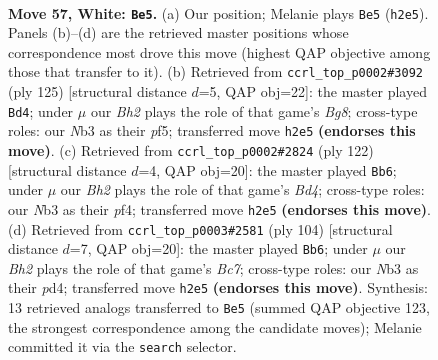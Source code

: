 \documentclass[11pt]{article}
\begin{document}
\clearpage

\begin{figure}[p]\centering
\begin{subfigure}{0.46\textwidth}\centering
\resizebox{\linewidth}{!}{%
\newchessgame
\chessboard[
  setfen={6k1/2P5/2r5/8/8/1N6/5K1B/8 w - - 27 57},
  showmover=false,
  pgfstyle=straightmove, color=movearrow, markmove={h2-e5}
]}
\caption{}
\end{subfigure}\hfill
\begin{subfigure}{0.46\textwidth}\centering
\resizebox{\linewidth}{!}{%
\newchessgame
\chessboard[
  setfen={8/5k2/2R5/2p2P2/8/8/4K3/6b1 b - - 8 63},
  showmover=false,
  pgfstyle=straightmove, color=movearrow, markmove={g1-d4}
]}
\caption{}
\end{subfigure}
\\[4pt]
\begin{subfigure}{0.46\textwidth}\centering
\resizebox{\linewidth}{!}{%
\newchessgame
\chessboard[
  setfen={r7/P7/4k3/8/3B1p2/8/8/5K2 w - - 9 62},
  showmover=false,
  pgfstyle=straightmove, color=movearrow, markmove={d4-b6}
]}
\caption{}
\end{subfigure}\hfill
\begin{subfigure}{0.46\textwidth}\centering
\resizebox{\linewidth}{!}{%
\newchessgame
\chessboard[
  setfen={8/2B5/6k1/8/3p4/8/6rP/4K3 w - - 4 53},
  showmover=false,
  pgfstyle=straightmove, color=movearrow, markmove={c7-b6}
]}
\caption{}
\end{subfigure}
\caption{\textbf{Move 57, White: \texttt{Be5}.} (a) Our position; Melanie plays \texttt{Be5} (\texttt{h2e5}). Panels (b)--(d) are the retrieved master positions whose correspondence most drove this move (highest QAP objective among those that transfer to it). (b) Retrieved from \texttt{ccrl\_top\_p0002\#3092} (ply 125) [structural distance $d$=5, QAP obj=22]: the master played \texttt{Bd4}; under $\mu$ our \emph{Bh2} plays the role of that game's \emph{Bg8}; cross-type roles: our \emph{N}b3 as their \emph{p}f5; transferred move \texttt{h2e5} \textbf{(endorses this move)}. (c) Retrieved from \texttt{ccrl\_top\_p0002\#2824} (ply 122) [structural distance $d$=4, QAP obj=20]: the master played \texttt{Bb6}; under $\mu$ our \emph{Bh2} plays the role of that game's \emph{Bd4}; cross-type roles: our \emph{N}b3 as their \emph{p}f4; transferred move \texttt{h2e5} \textbf{(endorses this move)}. (d) Retrieved from \texttt{ccrl\_top\_p0003\#2581} (ply 104) [structural distance $d$=7, QAP obj=20]: the master played \texttt{Bb6}; under $\mu$ our \emph{Bh2} plays the role of that game's \emph{Bc7}; cross-type roles: our \emph{N}b3 as their \emph{p}d4; transferred move \texttt{h2e5} \textbf{(endorses this move)}. Synthesis: 13 retrieved analogs transferred to \texttt{Be5} (summed QAP objective 123, the strongest correspondence among the candidate moves); Melanie committed it via the \texttt{search} selector.}
\label{fig:thought-m112}
\end{figure}
\end{document}
